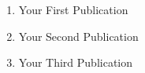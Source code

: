 \setlength{\parskip}{\baselineskip}


\begin{enumerate}
	\item Your First Publication
	\item Your Second Publication
	\item Your Third Publication
\end{enumerate}

